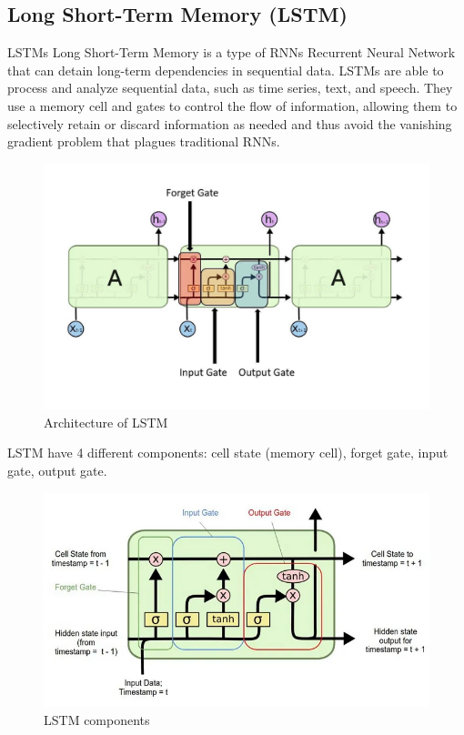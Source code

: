 \documentclass{ieeeojies}
\begin{document}
\subsection{Long Short-Term Memory (LSTM)}
LSTMs Long Short-Term Memory is a type of RNNs Recurrent Neural Network that can detain long-term dependencies in sequential data. LSTMs are able to process and analyze sequential data, such as time series, text, and speech. They use a memory cell and gates to control the flow of information, allowing them to selectively retain or discard information as needed and thus avoid the vanishing gradient problem that plagues traditional RNNs.
\begin{figure}[H]
	\centering
	\begin{minipage}{0.32\textwidth}
		\centering
		\includegraphics[width=1\textwidth]{bibliography/Images/LSTM_Img1.jpg}
		\caption{Architecture of LSTM}
		\label{fig:1}
	\end{minipage}
\end{figure}
LSTM have 4 different components: cell state (memory cell), forget gate, input gate, output gate.
\begin{figure}[H]
	\centering
	\begin{minipage}{0.32\textwidth}
		\centering
		\includegraphics[width=1\textwidth]{bibliography/Images/LSTM_Img2.png}
		\caption{LSTM components}
		\label{fig:1}
	\end{minipage}
\end{figure}
\end{document}
